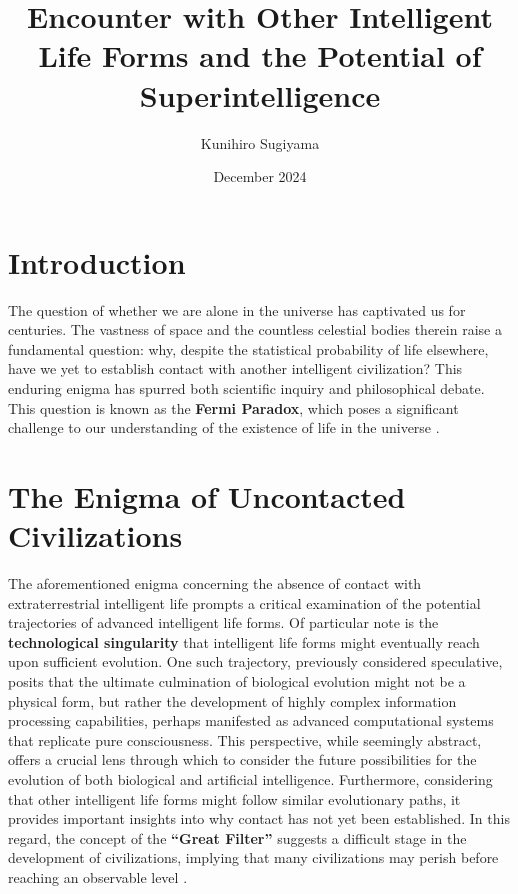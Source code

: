 \documentclass[12pt]{article}
\title{\textbf{Encounter with Other Intelligent Life Forms and the Potential of Superintelligence}}
\author{Kunihiro Sugiyama}
\date{December 2024}
\begin{document}
\maketitle

\section{Introduction}
The question of whether we are alone in the universe has captivated us for centuries. The vastness of space and the countless celestial bodies therein raise a fundamental question: why, despite the statistical probability of life elsewhere, have we yet to establish contact with another intelligent civilization? This enduring enigma has spurred both scientific inquiry and philosophical debate. This question is known as the \textbf{Fermi Paradox}, which poses a significant challenge to our understanding of the existence of life in the universe \cite{hart1975}.

\section{The Enigma of Uncontacted Civilizations}
The aforementioned enigma concerning the absence of contact with extraterrestrial intelligent life prompts a critical examination of the potential trajectories of advanced intelligent life forms. Of particular note is the \textbf{technological singularity} that intelligent life forms might eventually reach upon sufficient evolution. One such trajectory, previously considered speculative, posits that the ultimate culmination of biological evolution might not be a physical form, but rather the development of highly complex information processing capabilities, perhaps manifested as advanced computational systems that replicate pure consciousness. This perspective, while seemingly abstract, offers a crucial lens through which to consider the future possibilities for the evolution of both biological and artificial intelligence. Furthermore, considering that other intelligent life forms might follow similar evolutionary paths, it provides important insights into why contact has not yet been established. In this regard, the concept of the \textbf{``Great Filter''} suggests a difficult stage in the development of civilizations, implying that many civilizations may perish before reaching an observable level \cite{hanson1998}.
\end{document}
